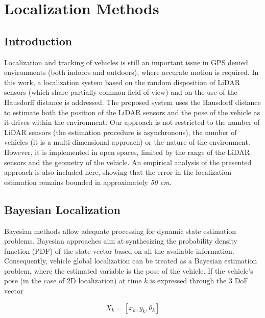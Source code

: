 \chapter{Localization Methods}

\section{Introduction}

Localization and tracking of vehicles is still an important issue in GPS denied environments (both indoors and outdoors), where accurate motion is required. In this work, a localization system based on the random disposition of LiDAR sensors (which share partially common field of view) and on the use of the Hausdorff distance is addressed. The proposed system uses the Hausdorff distance to estimate both the position of the LiDAR sensors and the pose of the vehicle as it drives within the environment. Our approach is not restricted to the number of LiDAR sensors (the estimation procedure is asynchronous), the number of vehicles (it is a multi-dimensional approach) or the nature of the environment. However, it is implemented in open spaces, limited by the range of the LiDAR sensors and the geometry of the vehicle. An empirical analysis of the presented approach is also included here, showing that the error in the localization estimation remains bounded in approximately \emph{50 cm}. 

\section{Bayesian Localization}

Bayesian methods \cite{Arulampalam02atutorial} allow adequate processing for dynamic state estimation problems. Bayesian approaches aim at synthesizing the probability density function (PDF) of the state vector based on all the available information. Consequently, vehicle global  localization can be treated as a Bayesian estimation problem, where the estimated variable is the pose of the vehicle. If the vehicle's pose (in the case of 2D localization) at time $k$ is expressed through the 3 DoF vector 

\begin{equation}
\label{Eq::ch2-1}
X_k = [x_k, y_k, \theta_k]
\end{equation}


